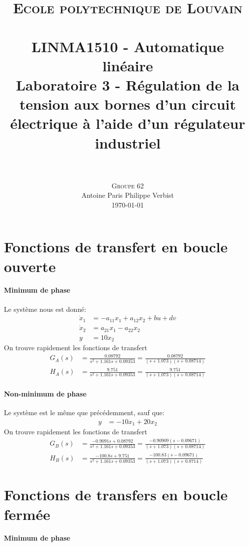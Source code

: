 \documentclass[frenchb, paper=a4, fontsize=11pt]{scrartcl}
\title{
		\usefont{OT1}{bch}{b}{n}
		\normalfont \normalsize \textsc{Ecole polytechnique de Louvain} \\ [25pt]
		\horrule{0.5pt} \\[0.4cm]
		\large LINMA1510 - Automatique linéaire\\
		\huge Laboratoire 3 - Régulation de la tension aux bornes d'un circuit
		électrique à l'aide d'un régulateur industriel \\
		\horrule{1.5pt} \\[0.5cm]
}
\author{
		\normalfont
		\textsc{Groupe 62}\\
      	Antoine Paris\hspace{0.6cm} Philippe Verbist \\	
       	\normalsize
        \today
}
\date{}
\numberwithin{equation}{section}					%
\numberwithin{figure}{section}					%
\numberwithin{table}{section}						%
\begin{document}
\maketitle

\section{Fonctions de transfert en boucle ouverte}
\paragraph{Minimum de phase}
Le système nous est donné:
\begin{align*}
\dot{x}_1 &= -a_{11}x_1 + a_{12}x_2 + bu + dv\\
\dot{x}_2 &= a_{21}x_1 - a_{22} x_2\\
y&= 10x_2
\end{align*}
On trouve rapidement les fonctions de transfert
\begin{align*}
G_A(s) &=\frac{0.08792}{s^2+1.161s+0.09353}
= \frac{0.08792}{(s+1.073)(s+0.08714)}\\
H_A(s) &= \frac{9.751}{s^2+1.161s+0.09353}
= \frac{9.751}{(s+1.073)(s+0.08714)}
\end{align*}

\paragraph{Non-minimum de phase}

Le système est le même que précédemment, sauf que:
\begin{align*}
y&= -10x_1 + 20x_2
\end{align*}
On trouve rapidement les fonctions de transfert
\begin{align*}
G_B(s) &=\frac{-0.9091s+0.08792}{s^2+1.161s+0.09353} = \frac{-0.90909(s-0.09671)}{(s+1.073)(s+0.08714)}\\
H_B(s) &= \frac{-100.8s+9.751}{s^2+1.161s+0.09353}
=\frac{-100.83(s-0.09671)}{(s+1.073)(s+0.8714)}
\end{align*}

\section{Fonctions de transfers en boucle fermée}
\paragraph{Minimum de phase}
\end{document}
